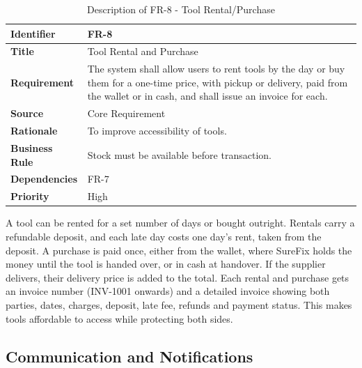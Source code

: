 \documentclass[A4paper,12pt]{report}
\theoremstyle{plain}
\theoremstyle{definition}
\theoremstyle{remark}
\numberwithin{equation}{section}
\begin{document}
\begin{table}[h!]
\centering
\caption{Description of FR-8 - Tool Rental/Purchase}
\begin{tabular}{|p{}|p{}|}
\hline
\textbf{Identifier} & FR-8 \\ \hline
\textbf{Title} & Tool Rental and Purchase \\ \hline
\textbf{Requirement} & The system shall allow users to rent tools by the day or buy them for a one-time price, with pickup or delivery, paid from the wallet or in cash, and shall issue an invoice for each. \\ \hline
\textbf{Source} & Core Requirement \\ \hline
\textbf{Rationale} & To improve accessibility of tools. \\ \hline
\textbf{Business Rule} & Stock must be available before transaction. \\ \hline
\textbf{Dependencies} & FR-7 \\ \hline
\textbf{Priority} & High \\ \hline
\end{tabular}
\end{table}

A tool can be rented for a set number of days or bought outright. Rentals carry a refundable deposit, and each late day costs one day's rent, taken from the deposit. A purchase is paid once, either from the wallet, where SureFix holds the money until the tool is handed over, or in cash at handover. If the supplier delivers, their delivery price is added to the total. Each rental and purchase gets an invoice number (INV-1001 onwards) and a detailed invoice showing both parties, dates, charges, deposit, late fee, refunds and payment status. This makes tools affordable to access while protecting both sides.


\newline

\subsection{Communication and Notifications}
\end{document}
